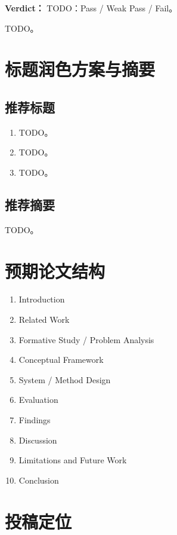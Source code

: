 \documentclass[UTF8,a4paper,11pt]{ctexart}
\begin{document}
\begin{tcolorbox}[keybox,title=可行性结论]
\textbf{Verdict：} TODO：Pass / Weak Pass / Fail。
\end{tcolorbox}

TODO。

\section{标题润色方案与摘要}

\subsection{推荐标题}

\begin{enumerate}[leftmargin=2em]
  \item TODO。
  \item TODO。
  \item TODO。
\end{enumerate}

\subsection{推荐摘要}

TODO。

\section{预期论文结构}

\begin{enumerate}[leftmargin=2em]
  \item Introduction
  \item Related Work
  \item Formative Study / Problem Analysis
  \item Conceptual Framework
  \item System / Method Design
  \item Evaluation
  \item Findings
  \item Discussion
  \item Limitations and Future Work
  \item Conclusion
\end{enumerate}

\section{投稿定位}
\end{document}
